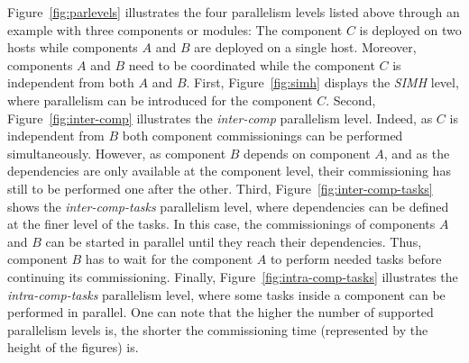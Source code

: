 Figure~\ref{fig:parlevels} illustrates the four parallelism levels
listed above through an example with three components or modules:
The component $C$ is deployed on two hosts while components
$A$ and $B$ are deployed on a single host. Moreover, components $A$
and $B$ need to be coordinated while the component $C$ is independent
from both $A$ and $B$.  First, Figure~\ref{fig:simh} displays
the \emph{SIMH} level, where parallelism can be introduced for the
component $C$. Second, Figure~\ref{fig:inter-comp} illustrates the
\emph{inter-comp} parallelism level. Indeed, as $C$ is independent from
$B$ both component commissionings can be performed
simultaneously. However, as component $B$ depends on component $A$,
and as the dependencies are only available at the component level,
their commissioning has still to be performed one after the
other. Third, Figure~\ref{fig:inter-comp-tasks} shows the
\emph{inter-comp-tasks} parallelism level, where dependencies can be
defined at the finer level of the tasks. In this case, the commissionings
of components $A$ and $B$ can be started in parallel until they reach
their dependencies. Thus, component $B$ has to wait for the component
$A$ to perform needed tasks before continuing its
commissioning. Finally, Figure~\ref{fig:intra-comp-tasks} illustrates
the \emph{intra-comp-tasks} parallelism level, where some tasks inside
a component can be performed in parallel. One can note that the
higher the number of supported parallelism levels is, the shorter
the commissioning time (represented by the height of the figures) is.


